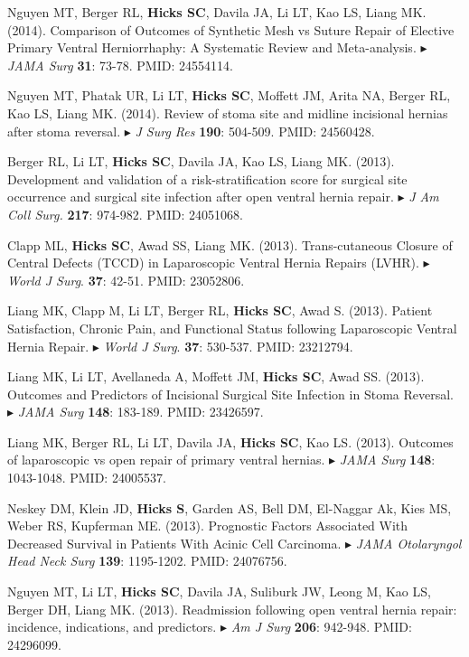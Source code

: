 \documentclass[10pt]{article}
\newcommand{\dg}[1]{{\color{black} $\blacktriangleright$ {#1}}}
\begin{document}
\item Nguyen MT, Berger RL, {\bf Hicks SC}, Davila JA, Li LT, Kao LS, Liang MK. (2014). Comparison of Outcomes of Synthetic Mesh vs Suture Repair of Elective Primary Ventral Herniorrhaphy: A Systematic Review and Meta-analysis. \dg{{\it JAMA Surg} {\bf 31}: 73-78. PMID: 24554114}.
\item Nguyen MT, Phatak UR, Li LT, {\bf Hicks SC}, Moffett JM, Arita NA, Berger RL, Kao LS, Liang MK. (2014). Review of stoma site and midline incisional hernias after stoma reversal. \dg{{\it J Surg Res} {\bf 190}: 504-509. PMID: 24560428}.
\item Berger RL, Li LT, {\bf Hicks SC}, Davila JA, Kao LS, Liang MK. (2013). Development and validation of a risk-stratification score for surgical site occurrence and surgical site infection after open ventral hernia repair. \dg{{\it J Am Coll Surg.} {\bf 217}: 974-982. PMID: 24051068}.
\item Clapp ML, \textbf{Hicks SC}, Awad SS, Liang MK. (2013). Trans-cutaneous Closure of Central Defects (TCCD) in Laparoscopic Ventral Hernia Repairs (LVHR). \dg{{\it World J Surg}. {\bf 37}: 42-51. PMID: 23052806}.
\item Liang MK, Clapp M, Li LT, Berger RL, {\bf Hicks SC}, Awad S. (2013). Patient Satisfaction, Chronic Pain, and Functional Status following Laparoscopic Ventral Hernia Repair. \dg{{\it World J Surg}. {\bf 37}: 530-537. PMID: 23212794}.
\item Liang MK, Li LT, Avellaneda A, Moffett JM, {\bf Hicks SC}, Awad SS. (2013). Outcomes and Predictors of Incisional Surgical Site Infection in Stoma Reversal. \dg{{\it JAMA Surg} {\bf 148}: 183-189. PMID: 23426597}.
\item Liang MK, Berger RL, Li LT, Davila JA, {\bf Hicks SC}, Kao LS. (2013). Outcomes of laparoscopic vs open repair of primary ventral hernias. \dg{{\it JAMA Surg} {\bf 148}: 1043-1048. PMID: 24005537}.
\item Neskey DM, Klein JD, {\bf Hicks S}, Garden AS, Bell DM, El-Naggar Ak, Kies MS, Weber RS, Kupferman ME. (2013). Prognostic Factors Associated With Decreased Survival in Patients With Acinic Cell Carcinoma. \dg{{\it JAMA Otolaryngol Head Neck Surg} {\bf 139}: 1195-1202. PMID: 24076756}.
\item Nguyen MT, Li LT, {\bf Hicks SC}, Davila JA, Suliburk JW, Leong M, Kao LS, Berger DH, Liang MK. (2013). Readmission following open ventral hernia repair: incidence, indications, and predictors.\dg{{\it Am J Surg} {\bf 206}: 942-948. PMID: 24296099}.
\end{document}
